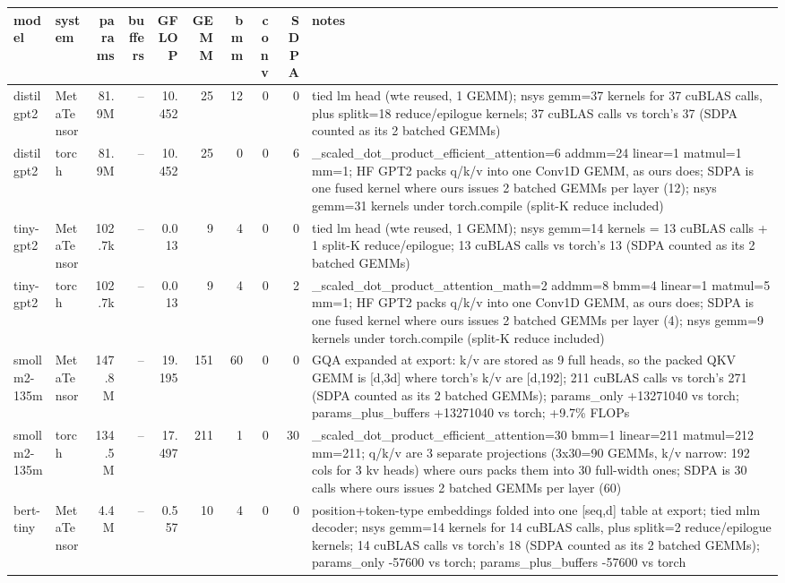 \begin{tabular}{llrrrrrrrp{}}
\toprule
model & system & params & buffers & GFLOP & GEMM & bmm & conv & SDPA & notes \\
\midrule
distilgpt2 & MetaTensor & 81.9M & -- & 10.452 & 25 & 12 & 0 & 0 & tied lm head (wte reused, 1 GEMM); nsys gemm=37 kernels for 37 cuBLAS calls, plus splitk=18 reduce/epilogue kernels; 37 cuBLAS calls vs torch's 37 (SDPA counted as its 2 batched GEMMs) \\
distilgpt2 & torch & 81.9M & -- & 10.452 & 25 & 0 & 0 & 6 & \_scaled\_dot\_product\_efficient\_attention=6 addmm=24 linear=1 matmul=1 mm=1; HF GPT2 packs q/k/v into one Conv1D GEMM, as ours does; SDPA is one fused kernel where ours issues 2 batched GEMMs per layer (12); nsys gemm=31 kernels under torch.compile (split-K reduce included) \\
tiny-gpt2 & MetaTensor & 102.7k & -- & 0.013 & 9 & 4 & 0 & 0 & tied lm head (wte reused, 1 GEMM); nsys gemm=14 kernels = 13 cuBLAS calls + 1 split-K reduce/epilogue; 13 cuBLAS calls vs torch's 13 (SDPA counted as its 2 batched GEMMs) \\
tiny-gpt2 & torch & 102.7k & -- & 0.013 & 9 & 4 & 0 & 2 & \_scaled\_dot\_product\_attention\_math=2 addmm=8 bmm=4 linear=1 matmul=5 mm=1; HF GPT2 packs q/k/v into one Conv1D GEMM, as ours does; SDPA is one fused kernel where ours issues 2 batched GEMMs per layer (4); nsys gemm=9 kernels under torch.compile (split-K reduce included) \\
smollm2-135m & MetaTensor & 147.8M & -- & 19.195 & 151 & 60 & 0 & 0 & GQA expanded at export: k/v are stored as 9 full heads, so the packed QKV GEMM is [d,3d] where torch's k/v are [d,192]; 211 cuBLAS calls vs torch's 271 (SDPA counted as its 2 batched GEMMs); params\_only +13271040 vs torch; params\_plus\_buffers +13271040 vs torch; +9.7\% FLOPs \\
smollm2-135m & torch & 134.5M & -- & 17.497 & 211 & 1 & 0 & 30 & \_scaled\_dot\_product\_efficient\_attention=30 bmm=1 linear=211 matmul=212 mm=211; q/k/v are 3 separate projections (3x30=90 GEMMs, k/v narrow: 192 cols for 3 kv heads) where ours packs them into 30 full-width ones; SDPA is 30 calls where ours issues 2 batched GEMMs per layer (60) \\
bert-tiny & MetaTensor & 4.4M & -- & 0.557 & 10 & 4 & 0 & 0 & position+token-type embeddings folded into one [seq,d] table at export; tied mlm decoder; nsys gemm=14 kernels for 14 cuBLAS calls, plus splitk=2 reduce/epilogue kernels; 14 cuBLAS calls vs torch's 18 (SDPA counted as its 2 batched GEMMs); params\_only -57600 vs torch; params\_plus\_buffers -57600 vs torch \\

\end{tabular}
